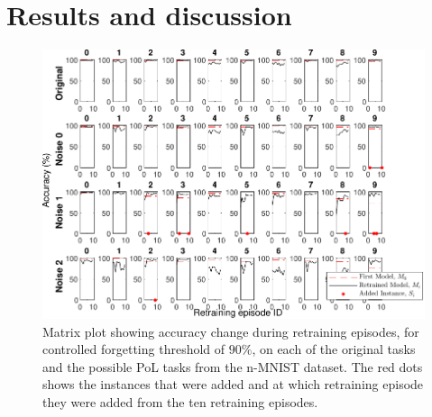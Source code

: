 \section{Results and discussion}
\begin{figure}[!t]
    \centering
        \includegraphics[width=1\textwidth]{../other/figures/90-117-3_v2.pdf}
    \caption{Matrix plot showing accuracy change during retraining episodes, for controlled forgetting threshold of $90\%$, on each of the original tasks and the possible PoL tasks from the n-MNIST dataset. The red dots shows the instances that were added and at which retraining episode they were added from the ten retraining episodes.}
    \label{Matrix_plot}
\end{figure}
